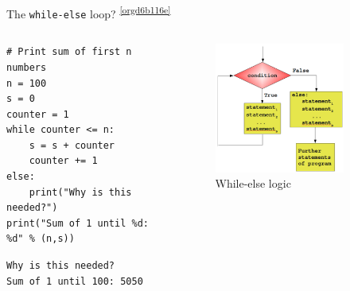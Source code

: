 \documentclass[presentation]{beamer}
\begin{document}
\begin{frame}[label={sec:org0a2b76b},fragile]{The \texttt{while-else} loop? \textsuperscript{\ref{orgd6b116e}}}
 \begin{columns}
\begin{column}{0.48\columnwidth}
\scriptsize
\begin{verbatim}
# Print sum of first n numbers
n = 100
s = 0
counter = 1
while counter <= n:
    s = s + counter
    counter += 1
else:
    print("Why is this needed?")
print("Sum of 1 until %d: %d" % (n,s))
\end{verbatim}

\begin{verbatim}
Why is this needed?
Sum of 1 until 100: 5050
\end{verbatim}
\end{column}

\begin{column}{0.45\columnwidth}
\footnotesize
\begin{figure}[htbp]
\centering
\includegraphics[width=0.8\textwidth]{images/while_loop_with_else.png}
\caption{While-else logic}
\end{figure}
\end{column}
\end{columns}

\end{frame}
\end{document}
